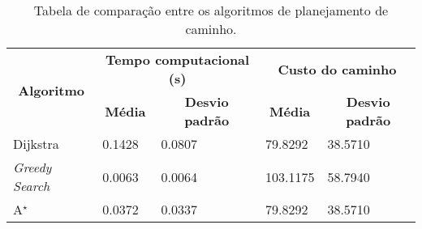 \documentclass[brazil, 12pt]{article}
\begin{document}
\begin{table}[H]
\centering
\caption{Tabela de comparação entre os algoritmos de planejamento de caminho.}
\label{tab:comp}
\begin{tabular}{|l|ll|ll|}
\hline
\multicolumn{1}{|c|}{\multirow{2}{*}{\textbf{Algoritmo}}} & \multicolumn{2}{c|}{\textbf{Tempo computacional (s)}}                             & \multicolumn{2}{c|}{\textbf{Custo do caminho}}                                    \\ \cline{2-5} 
\multicolumn{1}{|c|}{}                                    & \multicolumn{1}{c|}{\textbf{Média}} & \multicolumn{1}{c|}{\textbf{Desvio padrão}} & \multicolumn{1}{c|}{\textbf{Média}} & \multicolumn{1}{c|}{\textbf{Desvio padrão}} \\ \hline

Dijkstra                & \multicolumn{1}{l|}{0.1428}      & 0.0807   & \multicolumn{1}{l|}{79.8292}      & 38.5710   \\ \hline
\textit{Greedy Search}  & \multicolumn{1}{l|}{0.0063}      & 0.0064   & \multicolumn{1}{l|}{103.1175}      & 58.7940   \\ \hline
A$^{\star}$             & \multicolumn{1}{l|}{0.0372}      & 0.0337   & \multicolumn{1}{l|}{79.8292}      & 38.5710   \\ \hline
\end{tabular}
\end{table}
\end{document}
